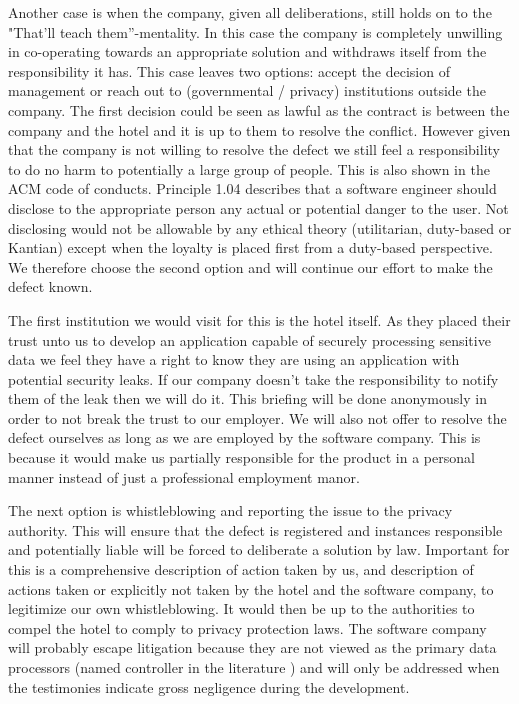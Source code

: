Another case is when the company, given all deliberations, still holds on to the "That'll teach them”-mentality. In this case the company is completely unwilling in co-operating towards an appropriate solution and withdraws itself from the responsibility it has. This case leaves two options: accept the decision of management or reach out to (governmental / privacy) institutions outside the company. The first decision could be seen as lawful as the contract is between the company and the hotel and it is up to them to resolve the conflict. However given that the company is not willing to resolve the defect we still feel a responsibility to do no harm to potentially a large group of people. This is also shown in the ACM code of conducts\cite{acm_code_of_conduct}. Principle 1.04 describes that a software engineer should disclose to the appropriate person any actual or potential danger to the user. Not disclosing would not be allowable by any ethical theory (utilitarian, duty-based or Kantian) except when the loyalty is placed first from a duty-based perspective. We therefore choose the second option and will continue our effort to make the defect known.

The first institution we would visit for this is the hotel itself. As they placed their trust unto us to develop an application capable of securely processing sensitive data we feel they have a right to know they are using an application with potential security leaks. If our company doesn't take the responsibility to notify them of the leak then we will do it. This briefing will be done anonymously in order to not break the trust to our employer. We will also not offer to resolve the defect ourselves as long as we are employed by the software company. This is because it would make us partially responsible for the product in a personal manner instead of just a professional employment manor.

The next option is whistleblowing and reporting the issue to the privacy authority. This will ensure that the defect is registered and instances responsible and potentially liable will be forced to deliberate a solution by law. Important for this is a comprehensive description of action taken by us, and description of actions taken or explicitly not taken by the hotel and the software company, to legitimize our own whistleblowing. It would then be up to the authorities to compel the hotel to comply to privacy protection laws. The software company will probably escape litigation because they are not viewed as the primary data processors (named controller in the literature \cite{privacy_directive}) and will only be addressed when the testimonies indicate gross negligence during the development.

